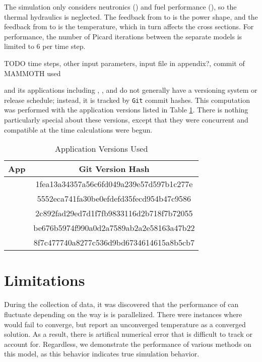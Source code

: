 The simulation only considers neutronics (\rattlesnake{}) and fuel performance (\bison{}), so the thermal hydraulics is neglected.
The feedback from \rattlesnake{} to \bison{} is the power shape, and the feedback from \bison{} to \rattlesnake{} is the
temperature, which in turn affects the cross sections.  For performance, the number of Picard iterations
between the separate models
is limited to 6 per time step.  

TODO time steps, other input parameters, input file in appendix?, commit of MAMMOTH used

\moose{} and its applications including \rattlesnake{}, \bison{}, and \mammoth{} do not generally have a
versioning system or release
schedule; instead, it is tracked by \texttt{Git} \cite{git} commit hashes.
This computation was performed with the application versions listed in Table \ref{tab:git}.  There is nothing
particularly special about these versions, except that they were concurrent and compatible at the time
calculations were begun.
\begin{table}
  \centering
  \begin{tabular}{c c}
    App & Git Version Hash \\ \hline
    \moose{ } & 1fea13a34357a56c6fd049a239e57d597b1c277e\\
    \bison{ } & 5552eca741fa30be0efdefd35fecd954b47c9586\\
    \rattlesnake{ } & 2c892fad29ed7d1f7fb9833116d2b718f7b72055\\
    \mammoth{ } & be676b5974f990a0d2a7589ab2a2e58163a47b22 \\ \hline
    \raven{ } & 8f7c477740a8277c536d9bd6734614615a8b5cb7
  \end{tabular}
  \caption{Application Versions Used}
  \label{tab:git}
\end{table}

\section{Limitations}
During the collection of data, it was discovered that the performance of \bison{} can fluctuate depending on
the way is is parallelized.  There were instances where \bison{} would fail to converge, but report an unconverged
temperature as a converged solution.  As a result, there is artifical numerical error that is difficult to track or
account for.  Regardless, we demonstrate the performance of various methods on this model, as this behavior indicates
true simulation behavior.

